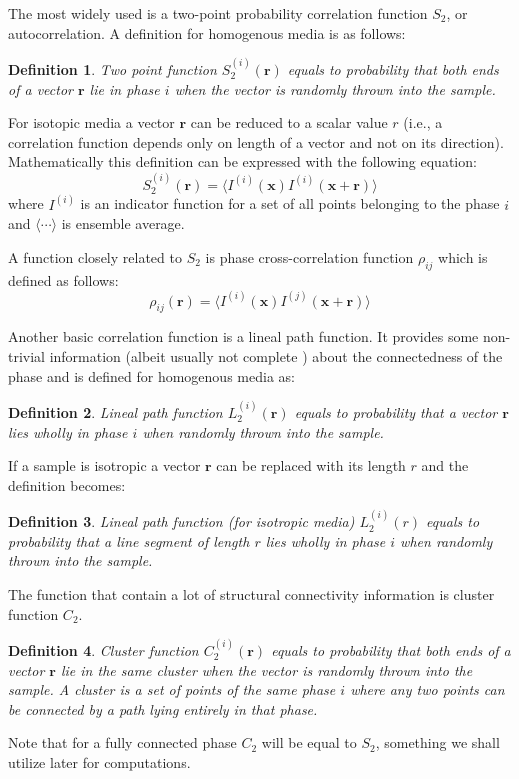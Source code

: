\documentclass[reprint,amsmath,amssymb,aps,pre,showkeys,showpacs,nofootinbib]{revtex4-1}
\newtheorem{definition}{Definition}
\begin{document}
The most widely used is a two-point probability correlation function $S_2$, or
autocorrelation. A definition for homogenous media is as follows:
\begin{definition}
  Two point function $S_2^{(i)}(\bm{r})$ equals to probability that both ends
  of a vector $\bm{r}$ lie in phase $i$ when the vector is randomly thrown
  into the sample.
\end{definition}
For isotopic media a vector $\bm{r}$ can be reduced to a scalar value
$r$ (i.e., a correlation function depends only on length of a vector and not on
its direction). Mathematically this definition can be expressed with the
following equation:
\begin{equation}
  S_2^{(i)}(\bm{r}) = \langle I^{(i)}(\bm{x}) I^{(i)}(\bm{x} +
  \bm{r}) \rangle
  \label{eq:s2-def}
\end{equation}
where $I^{(i)}$ is an indicator function for a set of all points belonging to
the phase $i$ and $\langle \cdots \rangle$ is ensemble average.

A function closely related to $S_2$ is phase cross-correlation function
$\rho_{ij}$ which is defined as follows:
\begin{equation}
  \rho_{ij}(\bm{r}) = \langle I^{(i)}(\bm{x}) I^{(j)}(\bm{x} +
  \bm{r}) \rangle
  \label{eq:cross-def}
\end{equation}

Another basic correlation function is a lineal path function. It provides some
non-trivial information (albeit usually not complete \cite{vcapek2011transport})
about the connectedness of the phase and is defined for homogenous media as:
\begin{definition}
  Lineal path function $L_2^{(i)}(\bm{r})$ equals to probability that a
  vector $\bm{r}$ lies wholly in phase $i$ when randomly thrown into the
  sample.
\end{definition}
If a sample is isotropic a vector $\bm{r}$ can be replaced with its length
$r$ and the definition becomes:
\begin{definition}
  Lineal path function (for isotropic media) $L_2^{(i)}(r)$ equals to
  probability that a line segment of length $r$ lies wholly in phase $i$ when
  randomly thrown into the sample.
\end{definition}

The function that contain a lot of structural connectivity information \cite{JiaoPNAS}
is cluster function $C_2$.
\begin{definition}
  Cluster function $C_2^{(i)}(\bm{r})$ equals to probability that both
  ends of a vector $\bm{r}$ lie in the same cluster when the vector is
  randomly thrown into the sample. A cluster is a set of points of the same
  phase $i$ where any two points can be connected by a path lying entirely in
  that phase.
\end{definition}
Note that for a fully connected phase $C_2$ will be equal to $S_2$, something
we shall utilize later for computations.
\end{document}
